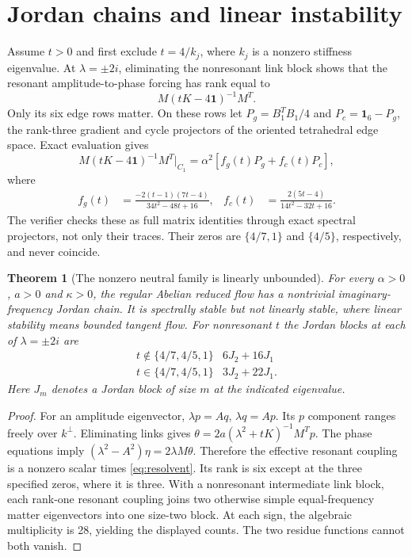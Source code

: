 \documentclass[11pt,a4paper]{article}
\newtheorem{theorem}{Theorem}\newtheorem{proposition}[theorem]{Proposition}\newtheorem{corollary}[theorem]{Corollary}
\newcommand{\id}{\mathbf1}\newcommand{\dd}{\mathrm d}\newcommand{\diag}{\operatorname{diag}}
\begin{document}
\newpage
\section{Jordan chains and linear instability}
Assume $t>0$ and first exclude $t=4/k_j$, where $k_j$ is a nonzero stiffness eigenvalue. At $\lambda=\pm2i$, eliminating the nonresonant link block shows that the resonant amplitude-to-phase forcing has rank equal to
\[
M(tK-4\id)^{-1}M^T.
\]
Only its six edge rows matter. On these rows let $P_g=B_1^TB_1/4$ and $P_c=\id_6-P_g$, the rank-three gradient and cycle projectors of the oriented tetrahedral edge space. Exact evaluation gives
\begin{equation}
M(tK-4\id)^{-1}M^T\big|_{C_1}
=\alpha^2\left[f_g(t)P_g+f_c(t)P_c\right],\label{eq:resolvent}
\end{equation}
where
\begin{align}
f_g(t)&=\frac{-2(t-1)(7t-4)}{34t^2-48t+16},&
f_c(t)&=\frac{2(5t-4)}{14t^2-32t+16}.\label{eq:residuefunctions}
\end{align}
The verifier checks these as full matrix identities through exact spectral projectors, not only their traces. Their zeros are $\{4/7,1\}$ and $\{4/5\}$, respectively, and never coincide.

\begin{theorem}[The nonzero neutral family is linearly unbounded]
For every $\alpha>0$, $a>0$ and $\kappa>0$, the regular Abelian reduced flow has a nontrivial imaginary-frequency Jordan chain. It is spectrally stable but not linearly stable, where linear stability means bounded tangent flow. For nonresonant $t$ the Jordan blocks at each of $\lambda=\pm2i$ are
\[
\begin{array}{c|c}
t\notin\{4/7,4/5,1\}&6J_2+16J_1\\
t\in\{4/7,4/5,1\}&3J_2+22J_1.
\end{array}
\]
Here $J_m$ denotes a Jordan block of size $m$ at the indicated eigenvalue.
\end{theorem}
\begin{proof}
For an amplitude eigenvector, $\lambda p=Aq$, $\lambda q=Ap$. Its $p$ component ranges freely over $k^\perp$. Eliminating links gives $\theta=2a(\lambda^2+tK)^{-1}M^Tp$. The phase equations imply
$(\lambda^2-A^2)\eta=2\lambda M\theta$. Therefore the effective resonant coupling is a nonzero scalar times \eqref{eq:resolvent}. Its rank is six except at the three specified zeros, where it is three. With a nonresonant intermediate link block, each rank-one resonant coupling joins two otherwise simple equal-frequency matter eigenvectors into one size-two block. At each sign, the algebraic multiplicity is 28, yielding the displayed counts. The two residue functions cannot both vanish.
\end{proof}
\end{document}
